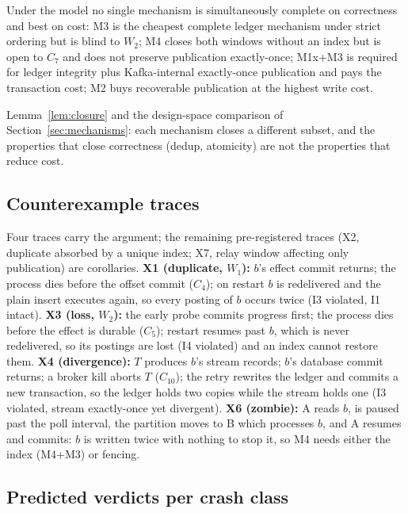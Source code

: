 \begin{proposition}[No dominance]
\label{prop:p12}
Under the model no single mechanism is simultaneously complete on correctness and best on cost:
M3 is the cheapest complete ledger mechanism under strict ordering but is blind to $W_2$; M4
closes both windows without an index but is open to $C_7$ and does not preserve publication
exactly-once; M1x+M3 is required for ledger integrity plus Kafka-internal exactly-once
publication and pays the transaction cost; M2 buys recoverable publication at the highest write
cost.
\end{proposition}
\begin{proofsketch}
Lemma~\ref{lem:closure} and the design-space comparison of Section~\ref{sec:mechanisms}: each mechanism
closes a different subset, and the properties that close correctness (dedup, atomicity) are not
the properties that reduce cost.
\end{proofsketch}

\subsection{Counterexample traces}
\label{sec:formal:traces}

Four traces carry the argument; the remaining pre-registered traces (X2, duplicate absorbed
by a unique index; X7, relay window affecting only publication) are corollaries. \textbf{X1
(duplicate, $W_1$):} $b$'s effect commit returns; the process dies before the offset commit
($C_4$); on restart $b$ is redelivered and the plain insert executes again, so every posting of
$b$ occurs twice (I3 violated, I1 intact). \textbf{X3 (loss, $W_2$):} the early probe commits
progress first; the process dies before the effect is durable ($C_5$); restart resumes past $b$,
which is never redelivered, so its postings are lost (I4 violated) and an index cannot restore
them. \textbf{X4 (divergence):} $T$ produces $b$'s stream records; $b$'s database commit
returns; a broker kill aborts $T$ ($C_{10}$); the retry rewrites the ledger and commits a new
transaction, so the ledger holds two copies while the stream holds one (I3 violated, stream
exactly-once yet divergent). \textbf{X6 (zombie):} A reads $b$, is paused past the poll
interval, the partition moves to B which processes $b$, and A resumes and commits: $b$ is
written twice with nothing to stop it, so M4 needs either the index (M4+M3) or fencing.

\subsection{Predicted verdicts per crash class}
\label{sec:formal:verdicts}


